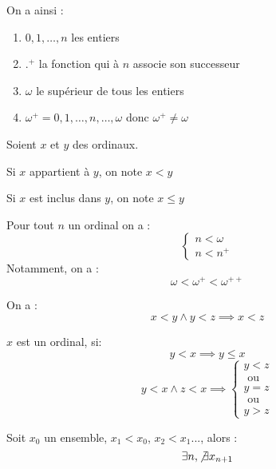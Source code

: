 On a ainsi : 
\begin{enumerate}
    \item \(0,1, \dots, n \) les entiers
    \item \(.^{+}\) la fonction qui à \(n\) associe son successeur
    \item \(\omega\) le supérieur de tous les entiers  
    \item \(\omega^{+} = {0,1, \dots, n, \dots, \omega}\) donc \(\omega^{+} \neq \omega\) 
\end{enumerate}

\begin{definition}[Comparaison]
    Soient \(x\) et \(y\) des ordinaux. 
    \begin{notation}
        Si \(x\) appartient à \(y\), on note \(x<y\)
    \end{notation}
    \begin{notation}
        Si \(x\) est inclus dans \(y\), on note \(x\leq y\) 
    \end{notation}
\end{definition}

\begin{corollary}[Propriétés]
    Pour tout \(n\) un ordinal on a : 
    \[
        \begin{cases}
            n < \omega \\
            n < n^{+}
        \end{cases}
    \]
    Notamment, on a : 
    \[
        \omega < \omega^{+} < \omega^{++}
    \]
\end{corollary}

\begin{corollary}[Transitivité]
    On a : 
    \[
        x<y \wedge y<z \implies x<z
    \]
\end{corollary}

\begin{definition}[Ordinal]
     \(x\) est un ordinal, si: 
    \[
        y<x \implies  y\leq x
    \]
    \[
        y<x \wedge z<x \implies 
        \begin{cases}
            y<z \\
            \text{ ou } \\
            y=z \\
            \text{ ou } \\
            y>z
        \end{cases}
    \]
\end{definition}

\begin{lemma}
    Soit \(x_{0}\) un ensemble, \(x_{1}<x_{0}\), \(x_{2}<x_{1}\)..., alors : 
    \[
        \exists n, \not\exists x_{n+1}
    \]   
\end{lemma}

